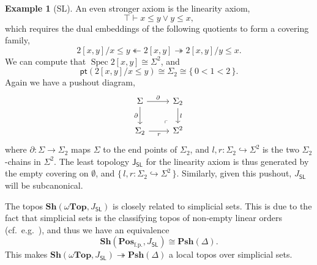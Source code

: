\documentclass[12pt]{amsart}
\theoremstyle{definition}
\newtheorem{example}[theorem]{Example}
\newcommand{\mb}[1]{\mathbf{#1}}
\newcommand{\mr}[1]{\mathrm{#1}}
\newcommand{\ms}[1]{\mathsf{#1}}
\newcommand{\Pos}{\mb{Pos}}
\newcommand{\sh}{\mb{Sh}}
\newcommand{\psh}{\mb{Psh}}
\newcommand{\set}[1]{\{\,#1\,\}}
\newcommand{\surj}{\twoheadrightarrow}
\newcommand{\hook}{\hookrightarrow}
\newcommand{\fp}{_{\mr{f.p.}}}
\newcommand{\emp}{\emptyset}
\newcommand{\pt}{\ms{pt}}
\newcommand{\wTop}{\omega\mb{Top}}
\newcommand{\spec}{\operatorname{Spec}}
\begin{document}
\begin{example}[SL]
  An even stronger axiom is the linearity axiom, 
  \[ \top \vdash x \le y \vee y \le x, \]
  which requires the dual embeddings of the following quotients to form a covering family,
  \[ 2[x,y]/x \le y \twoheadleftarrow 2[x,y] \surj 2[x,y]/y \le x. \]
  We can compute that $\spec 2[x,y] \cong \Sigma^2$, and 
  \[ \pt(2[x,y]/x \le y) \cong \Sigma_2 \cong \set{0 < 1 < 2}. \]
  Again we have a pushout diagram,
  \[
  \begin{tikzcd}
    \Sigma \ar[r, "\partial"] \ar[d, "\partial"'] & \Sigma_2 \ar[d, "l"] \\ 
    \Sigma_2 \ar[r, "r"'] & \Sigma^2
    \arrow["\lrcorner"{anchor=center, pos=0.125, rotate=180}, draw=none, from=2-2, to=1-1]
  \end{tikzcd}
  \]
  where $\partial : \Sigma \to \Sigma_2$ maps $\Sigma$ to the end points of $\Sigma_2$, and $l,r : \Sigma_2 \hook \Sigma^2$ is the two $\Sigma_2$-chains in $\Sigma^2$. The least topology $\ms J_{\ms{SL}}$ for the linearity axiom is thus generated by the empty covering on $\emp$, and $\set{l,r : \Sigma_2 \hook \Sigma^2}$. Similarly, given this pushout, $J_{\ms{SL}}$ will be subcanonical.

  The topos $\sh(\wTop,J_{\ms{SL}})$ is closely related to simplicial sets. This is due to the fact that simplicial sets is the classifying topos of non-empty linear orders (cf.\ e.g.~\cite[VIII. 8]{maclane2012sheaves}), and thus we have an equivalence 
  \[ \sh(\Pos\fp,J_{\ms{SL}}) \cong \psh(\Delta). \]
  This makes $\sh(\wTop,J_{\ms{SL}}) \surj \psh(\Delta)$ a local topos over simplicial sets.
\end{example}
\end{document}
